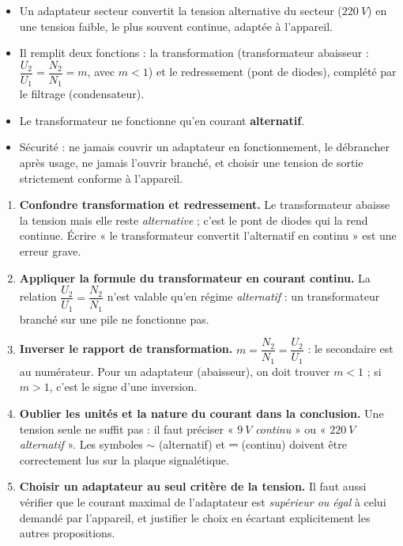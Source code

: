 \documentclass[11pt]{article}
\newcommand{\cle}[1]{{\popxbold\color{popdark}#1}}
\begin{document}
\begin{aretenir}
\begin{itemize}
\item Un \cle{adaptateur secteur} convertit la tension alternative du secteur ($\SI{220}{V}$) en une tension faible, le plus souvent continue, adaptée à l'appareil.
\item Il remplit deux fonctions : la \cle{transformation} (transformateur abaisseur : $\dfrac{U_2}{U_1} = \dfrac{N_2}{N_1} = m$, avec $m < 1$) et le \cle{redressement} (pont de diodes), complété par le \cle{filtrage} (condensateur).
\item Le transformateur ne fonctionne qu'en courant \textbf{alternatif}.
\item Sécurité : ne jamais couvrir un adaptateur en fonctionnement, le débrancher après usage, ne jamais l'ouvrir branché, et choisir une tension de sortie strictement conforme à l'appareil.
\end{itemize}
\end{aretenir}

\begin{attention}
\begin{enumerate}
\item \textbf{Confondre transformation et redressement.} Le transformateur abaisse la tension mais elle reste \emph{alternative} ; c'est le pont de diodes qui la rend continue. Écrire « le transformateur convertit l'alternatif en continu » est une erreur grave.
\item \textbf{Appliquer la formule du transformateur en courant continu.} La relation $\dfrac{U_2}{U_1} = \dfrac{N_2}{N_1}$ n'est valable qu'en régime \emph{alternatif} : un transformateur branché sur une pile ne fonctionne pas.
\item \textbf{Inverser le rapport de transformation.} $m = \dfrac{N_2}{N_1} = \dfrac{U_2}{U_1}$ : le secondaire est au numérateur. Pour un adaptateur (abaisseur), on doit trouver $m < 1$ ; si $m > 1$, c'est le signe d'une inversion.
\item \textbf{Oublier les unités et la nature du courant dans la conclusion.} Une tension seule ne suffit pas : il faut préciser « $\SI{9}{V}$ \emph{continu} » ou « $\SI{220}{V}$ \emph{alternatif} ». Les symboles $\sim$ (alternatif) et ⎓ (continu) doivent être correctement lus sur la plaque signalétique.
\item \textbf{Choisir un adaptateur au seul critère de la tension.} Il faut aussi vérifier que le courant maximal de l'adaptateur est \emph{supérieur ou égal} à celui demandé par l'appareil, et justifier le choix en écartant explicitement les autres propositions.
\end{enumerate}
\end{attention}
\end{document}

